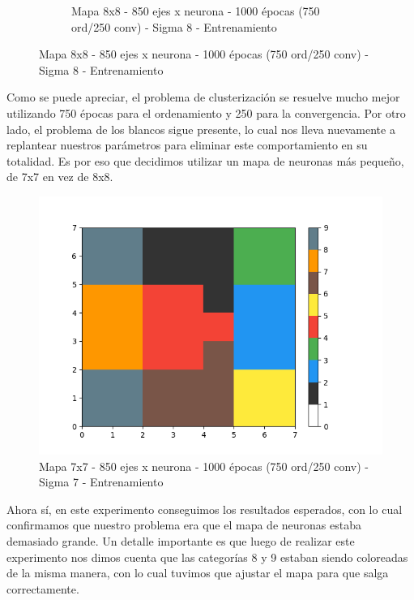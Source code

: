 \begin{figure}[!htbp]
\begin{subfigure}{.5\textwidth}
  \caption{Mapa 8x8 - 850 ejes x neurona - 1000 épocas (750 ord/250 conv) - Sigma 8 - Entrenamiento}
  \label{fig:sub2}
\end{subfigure}
\end{figure}

Como se puede apreciar, el problema de clusterización se resuelve mucho mejor utilizando 750 épocas para el ordenamiento y 250 para la convergencia. Por otro lado, el problema de los blancos sigue presente, lo cual nos lleva nuevamente a replantear nuestros parámetros para eliminar este comportamiento en su totalidad. Es por eso que decidimos utilizar un mapa de neuronas más pequeño, de 7x7 en vez de 8x8. 

\begin{figure}[!htbp]
  \begin{center}
    \includegraphics[scale=0.6]{../img/map7x7_1000ep_850en_sigma7_faseord750.png}
  \caption{Mapa 7x7 - 850 ejes x neurona - 1000 épocas (750 ord/250 conv) - Sigma 7 - Entrenamiento}
  \end{center}
\end{figure}

Ahora sí, en este experimento conseguimos los resultados esperados, con lo cual confirmamos que nuestro problema era que el mapa de neuronas estaba demasiado grande. Un detalle importante es que luego de realizar este experimento nos dimos cuenta que las categorías 8 y 9 estaban siendo coloreadas de la misma manera, con lo cual tuvimos que ajustar el mapa para que salga correctamente.

\newpage

